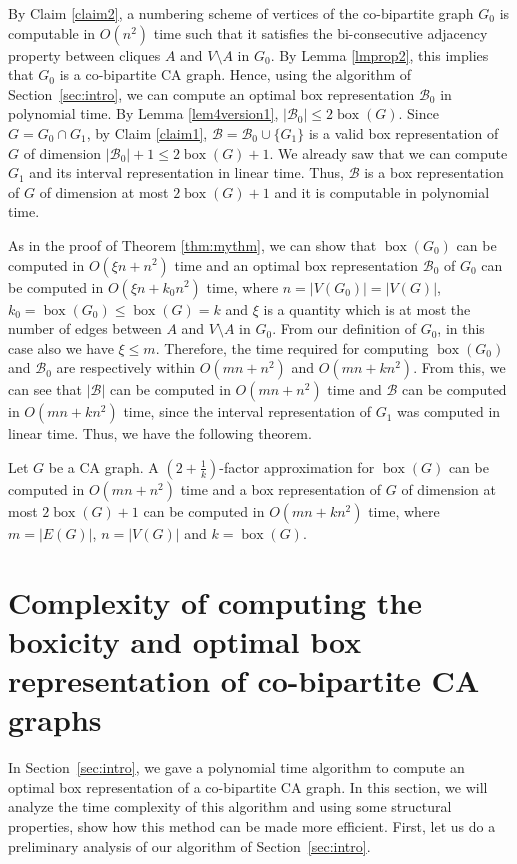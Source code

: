 By Claim \ref{claim2}, a numbering scheme of vertices of the co-bipartite graph $G_0$ is computable in $O(n^2)$ time such that it satisfies the 
bi-consecutive adjacency property between cliques $A$ and $V\setminus A$ in $G_0$. By Lemma \ref{lmprop2}, this implies that $G_0$ is a 
co-bipartite CA graph. Hence, using the algorithm of Section~\ref{sec:intro}, we can compute an optimal box representation $\mathcal{B}_0$ in polynomial time. By Lemma \ref{lem4version1}, $|\mathcal{B}_0| \le 2 \operatorname{box}(G)$. Since $G= G_0 \cap G_1$, by Claim \ref{claim1}, $\mathcal{B}= \mathcal{B}_0 \cup \{G_1\}$ is a valid box representation of $G$ of dimension $|\mathcal{B}_0|+1 \le 2 \operatorname{box}(G) +1$. We already saw that we can compute $G_1$ and its interval representation in linear time. Thus, $\mathcal{B}$ is a box representation of $G$ of dimension at most $2 \operatorname{box}(G)+1$ and it is computable in polynomial time. 

As in the proof of Theorem \ref{thm:mythm}, we can show that $\operatorname{box}(G_0)$ can be computed in $O(\xi n+n^2)$ time and an optimal box representation $\mathcal{B}_0$ of $G_0$ can be computed in $O(\xi n+k_0 n^2)$ time, where $n=|V(G_0)|=|V(G)|$, $k_0=\operatorname{box}(G_0) \le \operatorname{box}(G)=k$ and $\xi$ is a quantity which is at most the number of edges between $A$ and $V \setminus A$ in $G_0$. From our definition of $G_0$, in this case also we have $\xi \le m$. Therefore, the time required for computing $\operatorname{box}(G_0)$ and $\mathcal{B}_0$ are respectively within $O(mn+n^2)$ and $O(mn+kn^2)$. From this, we can see that $|\mathcal{B}|$ can be computed in $O(mn+n^2)$ time and $\mathcal{B}$ can be computed in $O(mn+kn^2)$ time, since the interval representation of $G_1$ was computed in linear time. Thus, we have the following theorem.
\begin{theorem}\label{approxCA}
 Let $G$ be a CA graph. A $\left(2+\frac{1}{k}\right)$-factor approximation for $\operatorname{box}(G)$ can be computed in $O(mn+n^2)$ time and a box representation of $G$ of dimension at most $2 \operatorname{box}(G)+1$ can be computed in $O(mn+kn^2)$ time, where $m=|E(G)|$, $n=|V(G)|$ and $k=\operatorname{box}(G)$.
\end{theorem}
\section[Complexity of the algorithm]{Complexity of computing the boxicity and optimal box representation of co-bipartite CA graphs} \label{complexity}
In Section~\ref{sec:intro}, we gave a polynomial time algorithm to compute an optimal box representation of a co-bipartite CA graph. 
In this section, we will analyze the time complexity of this algorithm and using some structural properties, show how this method 
can be made more efficient. First, let us do a preliminary analysis of our algorithm of Section~\ref{sec:intro}. 

